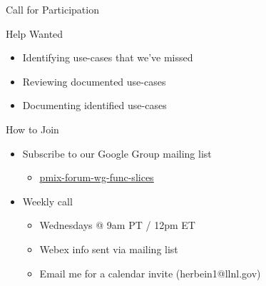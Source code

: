 \documentclass[presentation]{beamer}
\begin{document}
\begin{frame}[label={sec:org71aff84}]{Call for Participation}
\begin{block}{Help Wanted}
\begin{itemize}
\item Identifying use-cases that we’ve missed
\item Reviewing documented use-cases
\item Documenting identified use-cases
\end{itemize}
\end{block}
\begin{block}{How to Join}
\begin{itemize}
\item Subscribe to our Google Group mailing list
\begin{itemize}
\item \href{https://groups.google.com/forum/\#!forum/pmix-forum-wg-func-slices}{\alert{{\color{blue}\underline{pmix-forum-wg-func-slices}}}}
\end{itemize}
\item Weekly call
\begin{itemize}
\item Wednesdays @ 9am PT / 12pm ET
\item Webex info sent via mailing list
\item Email me for a calendar invite (herbein1@llnl.gov)
\end{itemize}
\end{itemize}
\end{block}
\end{frame}
\end{document}
